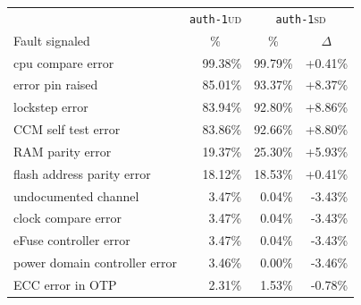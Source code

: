 \documentclass[10pt]{article}
\newcommand{\authone}{\texttt{auth-1}\xspace}
\newcommand{\UD}{\textsc{ud}\xspace}
\newcommand{\SD}{\textsc{sd}\xspace}
\begin{document}
        \begin{table}[H]
          \centering
          \begin{tabular}{lr|rr}
          \toprule
          \multicolumn{1}{c}{\ }
          & \multicolumn{1}{c}{\authone \UD}
          & \multicolumn{2}{c}{\authone \SD}
          \\
          \cmidrule(lr){2-2}  
          \cmidrule(lr){3-4}  
          Fault signaled
          & \multicolumn{1}{c}{\%} 
          & \multicolumn{1}{c}{\%} & \multicolumn{1}{c}{$\Delta$}
          \\
          \midrule
          cpu compare error 
          & 99.38\%
          & 99.79\% & +0.41\%
          \\
          error pin raised 
          & 85.01\%
          & 93.37\% & +8.37\%
          \\
          lockstep error 
          & 83.94\%
          & 92.80\% & +8.86\%
          \\
          CCM self test error 
          & 83.86\%
          & 92.66\% & +8.80\%
          \\
          RAM parity error 
          & 19.37\%
          & 25.30\% & +5.93\%
          \\
          flash address parity error 
          & 18.12\%
          & 18.53\% & +0.41\%
          \\
          undocumented channel 
          & 3.47\%
          & 0.04\% & -3.43\%
          \\
          clock compare error 
          & 3.47\%
          & 0.04\% & -3.43\%
          \\
          eFuse controller error 
          & 3.47\%
          & 0.04\% & -3.43\%
          \\
          power domain controller error 
          & 3.46\%
          & 0.00\% & -3.46\%
          \\
          ECC error in OTP 
          & 2.31\%
          & 1.53\% & -0.78\%
          \\

\end{tabular}
\end{table}
\end{document}
